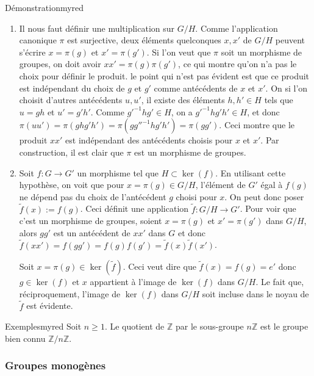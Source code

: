     \begin{demo}{Démonstration}{myred}
        \begin{enumerate}
            \item Il nous faut définir une multiplication sur $ G / H$. Comme l’application canonique $\pi$ est surjective, deux éléments quelconques $x,x'$ de $G / H$ peuvent s’écrire $x = \pi(g)$ et $x' = \pi(g')$. Si l’on veut que $\pi$ soit un morphisme de groupes, on doit avoir $x x ' = \pi(g) \pi(g')$, ce qui montre qu’on n’a pas le choix pour définir le produit. le point qui n’est pas évident est que ce produit est indépendant du choix de $g$ et $g'$ comme antécédents de $x$ et $x'$. On si l’on choisit d’autres antécédents $u, u'$, il existe des éléments $h, h' \in H$ tels que $u = gh$ et $u' = g' h'$. Comme $g'^{-1} h g' \in H$, on a $g'^{-1} h g' h' \in H$, et donc $\pi(uu')= \pi(ghg'h') = \pi(gg''^{-1} h g' h') = \pi(gg')$. Ceci montre que le produit $xx'$ est indépendant des antécédents choisis pour $x$ et $x'$. Par construction, il est clair que $\pi$ est un morphisme de groupes.
            \item Soit $f : G \to G'$ un morphisme tel que $H \subset \ker(f)$. En utilisant cette hypothèse, on voit que pour $x = \pi(g) \in G / H$, l’élément de $G'$ égal à $f(g)$ ne dépend pas du choix de l’antécédent $g$ choisi pour $x$. On peut donc poser $\tilde{f}(x) := f(g)$. Ceci définit une application $\tilde{f} : G / H \to G'$. Pour voir que c’est un morphisme de groupes, soient $x = \pi(g)$ et $x' = \pi(g')$ dans $G / H$, alors $gg'$ est un antécédent de $xx'$ dans $G$ et donc $\tilde{f}(xx') = f(gg') = f(g)f(g') = \tilde{f}(x) \tilde{f}(x')$. 
            
            Soit $x = \pi(g) \in \ker(\tilde{f})$. Ceci veut dire que $\tilde{f}(x) = f(g) = e'$ donc $g \in \ker(f)$ et $x$ appartient à l’image de $\ker(f)$ dans $G / H$. Le fait que, réciproquement, l’image de $\ker(f)$ dans $G / H$ soit incluse dans le noyau de $\tilde{f}$ est évidente.
        \end{enumerate}
    \end{demo}

    \begin{omed}{Exemples}{myred}
        Soit $n \geq 1$. Le quotient de $\mathbb{Z}$ par le sous-groupe $n \mathbb{Z}$ est le groupe bien connu $\mathbb{Z} / n \mathbb{Z}$.
    \end{omed}

    \subsubsection{Groupes monogènes}

